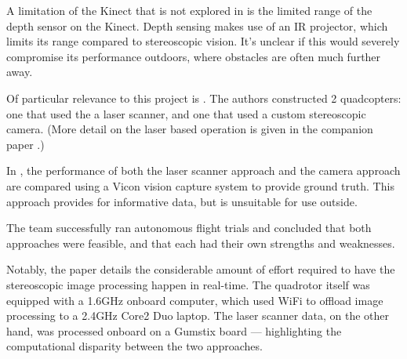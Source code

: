 \documentclass[12pt,oneside,a4paper]{book}
\begin{document}
A limitation of the Kinect that is not explored in
\cite{huang2011visual} is the limited range of the depth sensor on the
Kinect. Depth sensing makes use of an IR projector, which limits its
range compared to stereoscopic vision. It's unclear if this would
severely compromise its performance outdoors, where obstacles are
often much further away.

Of particular relevance to this project is \cite{achtelik2009stereo}. The authors
constructed 2 quadcopters: one that used the a laser scanner, and one
that used a custom stereoscopic camera. (More detail on the laser
based operation is given in the companion paper
\cite{Bachrach09autonomousflight}.) 

In \cite{achtelik2009stereo}, the performance of both the laser
scanner approach and the camera approach are compared using a Vicon
vision capture system to provide ground truth. This approach provides
for informative data, but is unsuitable for use outside.

The team successfully ran autonomous flight trials and concluded that
both approaches were feasible, and that each had their own strengths
and weaknesses.

Notably, the paper details the considerable amount of effort required to have
the stereoscopic image processing happen in real-time. The quadrotor
itself was equipped with a 1.6GHz onboard computer, which used WiFi to
offload image processing to a 2.4GHz Core2 Duo laptop. The laser
scanner data, on the other hand, was processed onboard on a Gumstix
board --- highlighting the computational disparity between the two
approaches.




\end{document}
